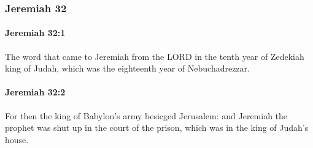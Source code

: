 	\subsubsection{Jeremiah 32} %
		\label{JEREMIAH-32}

		\paragraph{Jeremiah 32:1} %
			\label{JEREMIAH-32-1}

			The word that came to Jeremiah from the LORD in the tenth year of Zedekiah king of Judah, which was the eighteenth year of Nebuchadrezzar.


		\paragraph{Jeremiah 32:2} %
			\label{JEREMIAH-32-2}

			For then the king of Babylon’s army besieged Jerusalem: and Jeremiah the prophet was shut up in the court of the prison, which was in the king of Judah’s house.

